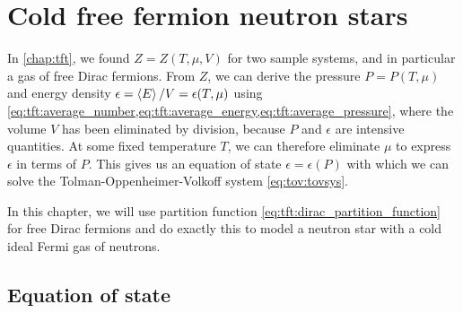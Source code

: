 \chapter{Cold free fermion neutron stars}





In \cref{chap:tft}, we found $Z = Z(T, \mu, V)$ for two sample systems, and in particular a gas of free Dirac fermions.
From $Z$, we can derive the pressure $P = P(T, \mu)$ and energy density $\epsilon = \left< E \right>/V = \epsilon(T, \mu)$ using \cref{eq:tft:average_number,eq:tft:average_energy,eq:tft:average_pressure}, where the volume $V$ has been eliminated by division, because $P$ and $\epsilon$ are intensive quantities.
At some fixed temperature $T$, we can therefore eliminate $\mu$ to express $\epsilon$ in terms of $P$.
This gives us an equation of state $\epsilon = \epsilon(P)$ with which we can solve the Tolman-Oppenheimer-Volkoff system \eqref{eq:tov:tovsys}.

In this chapter, we will use partition function \eqref{eq:tft:dirac_partition_function} for free Dirac fermions and do exactly this to model a neutron star with a cold ideal Fermi gas of neutrons.

\section{Equation of state}

